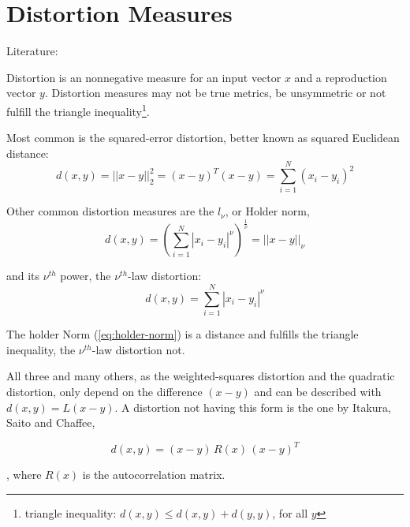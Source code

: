 \section{Distortion Measures}\label{sec:lvq-distortion-measures}
Literature: \cite{Linde1980}

Distortion is an nonnegative measure for an input vector $x$ and a reproduction
vector $y$. Distortion measures may not be true metrics, \eg be unsymmetric or
not fulfill the triangle inequality\footnote{triangle inequality: $d(x, y) \leq d(x, y) + d(y, y)$, for all $y$}.

Most common is the squared-error distortion, better known as squared Euclidean
distance:
\begin{equation}
d(x, y) = ||x-y||_2^2 = (x-y)^T (x-y) = \sum_{i=1}^N (x_i-y_i)^2
\end{equation}

Other common distortion measures are the $l_\nu$, or Holder norm,
\begin{equation}\label{eq:holder-norm}
d(x, y) = \left( \sum_{i=1}^N |x_i - y_i|^\nu \right) ^{\frac{1}{\nu}} = || x - y ||_\nu
\end{equation}

and its $\nu^{th}$ power, the $\nu^{th}$-law distortion:
\begin{equation}
d(x, y) = \sum_{i=1}^N |x_i - y_i|^\nu
\end{equation}

The holder Norm (\cref{eq:holder-norm}) is a distance and fulfills the triangle
inequality, the $\nu^{th}$-law distortion not.

All three and many others, as the weighted-squares distortion and the quadratic
distortion, only depend on the difference $(x - y)$ and can be described with
$d(x, y) = L(x - y)$. A distortion not having this form is the one by Itakura,
Saito and Chaffee,

\begin{equation}
d(x, y) = (x - y)\, R(x)\, (x - y)^T
\end{equation}

, where $R(x)$ is the autocorrelation matrix.
